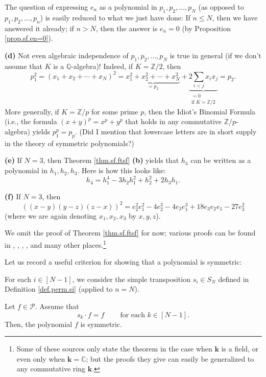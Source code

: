 \begin{example}
The question of expressing $e_{n}$ as a polynomial in $p_{1},p_{2}%
,\ldots,p_{N}$ (as opposed to $p_{1},p_{2},\ldots,p_{n}$) is easily reduced to
what we just have done: If $n\leq N$, then we have answered it already; if
$n>N$, then the answer is $e_{n}=0$ (by Proposition \ref{prop.sf.en=0}).
\medskip

\textbf{(d)} Not even algebraic independence of $p_{1},p_{2},\ldots,p_{N}$ is
true in general (if we don't assume that $K$ is a $\mathbb{Q}$-algebra)!
Indeed, if $K=\mathbb{Z}/2$, then%
\[
p_{1}^{2}=\left(  x_{1}+x_{2}+\cdots+x_{N}\right)  ^{2}=\underbrace{x_{1}%
^{2}+x_{2}^{2}+\cdots+x_{N}^{2}}_{=p_{2}}+\underbrace{2\sum_{i<j}x_{i}x_{j}%
}_{\substack{=0\\\text{if }K=\mathbb{Z}/2}}=p_{2}.
\]
More generally, if $K=\mathbb{Z}/p$ for some prime $p$, then the Idiot's
Binomial Formula (i.e., the formula $\left(  x+y\right)  ^{p}=x^{p}+y^{p}$
that holds in any commutative $\mathbb{Z}/p$-algebra) yields $p_{1}^{p}=p_{p}%
$. (Did I mention that lowercase letters are in short supply in the theory of
symmetric polynomials?) \medskip

\textbf{(e)} If $N=3$, then Theorem \ref{thm.sf.ftsf} \textbf{(b)} yields that
$h_{4}$ can be written as a polynomial in $h_{1},h_{2},h_{3}$. Here is how
this looks like:%
\[
h_{4}=h_{1}^{4}-3h_{2}h_{1}^{2}+h_{2}^{2}+2h_{3}h_{1}.
\]


\textbf{(f)} If $N=3$, then
\[
\left(  \left(  x-y\right)  \left(  y-z\right)  \left(  z-x\right)  \right)
^{2}=e_{2}^{2}e_{1}^{2}-4e_{2}^{3}-4e_{3}e_{1}^{3}+18e_{3}e_{2}e_{1}%
-27e_{3}^{2}%
\]
(where we are again denoting $x_{1},x_{2},x_{3}$ by $x,y,z$).
\end{example}

We omit the proof of Theorem \ref{thm.sf.ftsf} for now; various proofs can be
found in \cite[Theorem 171]{Benede25}, \cite[proof of Theorem 1]{BluCos16},
\cite[Theorem 1.2.1]{Dumas08}, \cite[Theorem 9.6.6]{Goodman}, \cite[\S 1.1]%
{Smith95} and many other places.\footnote{Some of these sources only state the
theorem in the case when $\mathbf{k}$ is a field, or even only when
$\mathbf{k}=\mathbb{C}$; but the proofs they give can easily be generalized to
any commutative ring $\mathbf{k}$.}

Let us record a useful criterion for showing that a polynomial is symmetric:

\begin{lemma}
\label{lem.sf.simples-enough}For each $i\in\left[  N-1\right]  $, we consider
the simple transposition $s_{i}\in S_{N}$ defined in Definition
\ref{def.perm.si} (applied to $n=N$).

Let $f\in\mathcal{P}$. Assume that
\begin{equation}
s_{k}\cdot f=f\ \ \ \ \ \ \ \ \ \ \text{for each }k\in\left[  N-1\right]  .
\label{eq.lem.sf.simples-enough.ass}%
\end{equation}
Then, the polynomial $f$ is symmetric.
\end{lemma}


